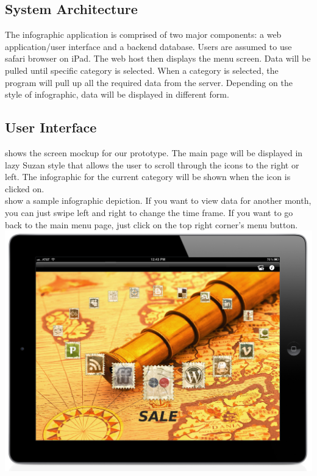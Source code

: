 \documentclass[11pt,a4paper,oneside]{article}
\begin{document}
\subsection{System Architecture}

The infographic application is comprised of two major components: a web application/user interface and a backend database. Users are assumed to use safari browser on iPad. The web host then displays the menu screen. Data will be pulled until specific category is selected. When a category is selected, the program will pull up all the required data from the server. Depending on the style of infographic, data will be displayed in different form.\\

\subsection{User Interface}

shows the screen mockup for our prototype.  The main page will be displayed in lazy Suzan style that allows the user to scroll through the icons to the right or left.  The infographic for the current category will be shown when the icon is clicked on.\\


show a sample infographic depiction.  If you want to view data for another month, you can just swipe left and right to change the time frame.  If you want to go back to the main menu page, just click on the top right corner’s menu button.\\


\includegraphics[width=1\textwidth]{images/screen.jpg}\\
\end{document}
